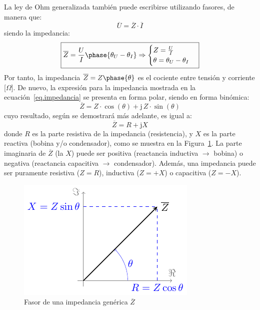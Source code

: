 \documentclass[11pt]{book} %
\begin{document}
	La ley de Ohm generalizada también puede escribirse utilizando fasores, de manera que: 
	\begin{equation}\label{eq.ohm_generalizada}
		\boxed{ \overline{U}=\overline{Z}\cdot\overline{I} }
	\end{equation}
	siendo la impedancia:
	\begin{equation}\label{eq.impedancia}
		\boxed{\overline{Z} = \frac{U}{I}\phase{\theta_U - \theta_I} \Rightarrow 
			\begin{cases}
				Z = \frac{U}{I}\\
				\theta = \theta_U - \theta_I
		\end{cases}}
	\end{equation}
	Por tanto, la impedancia $\overline{Z}=Z\phase{\theta}$ es el cociente entre tensión y corriente [$\Omega$]. De nuevo, la expresión para la impedancia mostrada en la ecuación~\eqref{eq.impedancia} se presenta en forma polar, siendo en forma binómica: 
	\begin{equation*}
		\overline{Z} = Z\cdot\cos(\theta)+\mathrm{j}\,Z\cdot\sin(\theta) %
	\end{equation*}
	cuyo resultado, según se demostrará más adelante, es igual a: 
	\begin{equation}
		\boxed{\overline{Z} =  R + \mathrm{j} X}
	\end{equation}
	donde $R$ es la parte resistiva de la impedancia (resistencia), y $X$ es la parte reactiva (bobina y/o condensador), como se muestra en la Figura~\ref{fig.fasorimpedancia}. La parte imaginaria de $\overline{Z}$ (la $X$) puede ser positiva (reactancia inductiva $\rightarrow$ bobina) o negativa (reactancia capacitiva $\rightarrow$ condensador). Además, una impedancia puede ser puramente resistiva ($Z=R$), inductiva ($Z=+X$) o capacitiva ($Z=-X$).
	\begin{figure}[htbp]
		\centering
		\includegraphics{../figs/fasorImpedancia.pdf}
		\caption{Fasor de una impedancia genérica $\overline{Z}$}
		\label{fig.fasorimpedancia}
	\end{figure}
	
\end{document}
